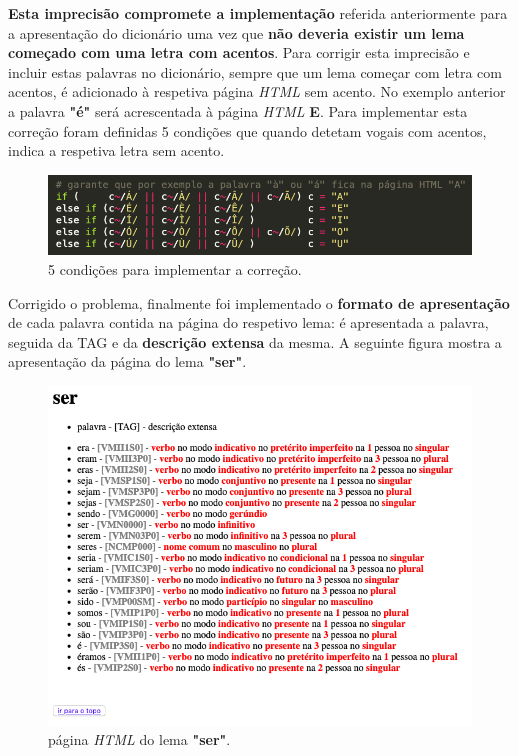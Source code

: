 \documentclass[11pt,a4paper]{report}%
\begin{document}
\textbf{Esta imprecisão compromete a implementação} referida anteriormente para a apresentação do dicionário uma vez que \textbf{não deveria existir um lema começado com uma letra com acentos}. Para corrigir esta imprecisão e incluir estas palavras no dicionário, sempre que um lema começar com letra com acentos, é adicionado à respetiva página \emph{HTML} sem acento. No exemplo anterior a palavra \textbf{"é"} será acrescentada à página \emph{HTML} \textbf{E}. Para implementar esta correção foram definidas 5 condições que quando detetam vogais com acentos, indica a respetiva letra sem acento.

\begin{figure}[H]
	\centering
	\includegraphics[scale=0.6]{code_fix.png}
	\caption{5 condições para implementar a correção. }
	\label{img:pag}
\end{figure}

Corrigido o problema, finalmente foi implementado o \textbf{formato de apresentação} de cada palavra contida na página do respetivo lema: é apresentada a palavra, seguida da TAG e da \textbf{descrição extensa} da mesma. A seguinte figura mostra a apresentação da página do lema \textbf{"ser"}.

\begin{figure}[H]
	\centering
	\includegraphics[scale=0.7]{ser.png}
	\caption{página \emph{HTML} do lema \textbf{"ser"}. }
	\label{img:pag}
\end{figure}
\end{document}
